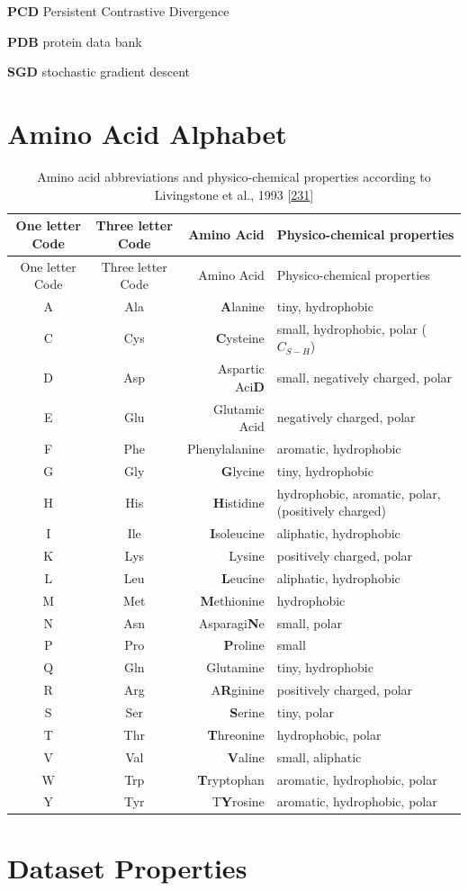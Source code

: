 \documentclass[11pt,a4paper,twoside]{book}
\newcommand{\blandscape}{\begin{landscape}}
\newcommand{\elandscape}{\end{landscape}}
\theoremstyle{definition}
\theoremstyle{definition}
\theoremstyle{remark}
\begin{document}
\textbf{PCD} Persistent Contrastive Divergence

\textbf{PDB} protein data bank

\textbf{SGD} stochastic gradient descent

\chapter{Amino Acid Alphabet}\label{amino-acids}

\blandscape

\begin{longtable}[]{@{}ccrl@{}}
\caption{\label{tab:amino-acid-prop} Amino acid abbreviations and
physico-chemical properties according to Livingstone et al., 1993
{[}\protect\hyperlink{ref-Livingstone1993}{231}{]}}\tabularnewline
\toprule
One letter Code & Three letter Code & Amino Acid & Physico-chemical
properties\tabularnewline
\midrule
\endfirsthead
\toprule
One letter Code & Three letter Code & Amino Acid & Physico-chemical
properties\tabularnewline
\midrule
\endhead
A & Ala & \textbf{A}lanine & tiny, hydrophobic\tabularnewline
C & Cys & \textbf{C}ysteine & small, hydrophobic, polar
(\(C_{S-H}\))\tabularnewline
D & Asp & Aspartic Aci\textbf{D} & small, negatively charged,
polar\tabularnewline
E & Glu & Glutamic Acid & negatively charged, polar\tabularnewline
F & Phe & Phenylalanine & aromatic, hydrophobic\tabularnewline
G & Gly & \textbf{G}lycine & tiny, hydrophobic\tabularnewline
H & His & \textbf{H}istidine & hydrophobic, aromatic, polar, (positively
charged)\tabularnewline
I & Ile & \textbf{I}soleucine & aliphatic, hydrophobic\tabularnewline
K & Lys & Lysine & positively charged, polar\tabularnewline
L & Leu & \textbf{L}eucine & aliphatic, hydrophobic\tabularnewline
M & Met & \textbf{M}ethionine & hydrophobic\tabularnewline
N & Asn & Asparagi\textbf{N}e & small, polar\tabularnewline
P & Pro & \textbf{P}roline & small\tabularnewline
Q & Gln & Glutamine & tiny, hydrophobic\tabularnewline
R & Arg & A\textbf{R}ginine & positively charged, polar\tabularnewline
S & Ser & \textbf{S}erine & tiny, polar\tabularnewline
T & Thr & \textbf{T}hreonine & hydrophobic, polar\tabularnewline
V & Val & \textbf{V}aline & small, aliphatic\tabularnewline
W & Trp & \textbf{T}ryptophan & aromatic, hydrophobic,
polar\tabularnewline
Y & Tyr & T\textbf{Y}rosine & aromatic, hydrophobic,
polar\tabularnewline
\bottomrule
\end{longtable}

\elandscape

\chapter{Dataset Properties}\label{dataset-properties}
\end{document}
